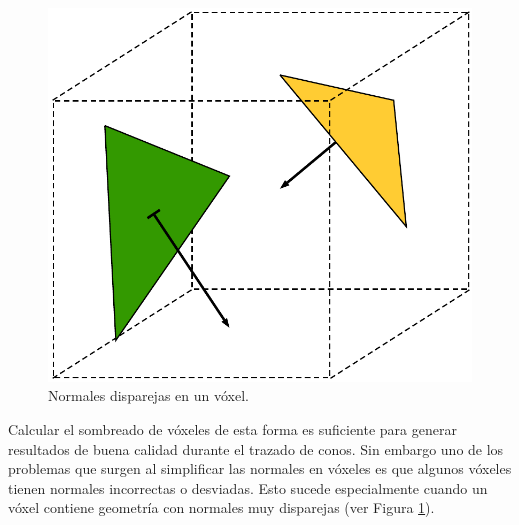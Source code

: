 \begin{figure}
	\centering
	\captionsetup{justification=centering}
	\includegraphics[width=\linewidth]{media/gimped_normals.pdf}
	\caption{Normales disparejas en un vóxel.}
	\label{fig:error_normals}
\end{figure}
\noindent Calcular el sombreado de vóxeles de esta forma es suficiente para generar resultados de buena calidad durante el trazado de conos. Sin embargo uno de los problemas que surgen al simplificar las normales en vóxeles es que algunos vóxeles tienen normales incorrectas o desviadas. Esto sucede especialmente cuando un vóxel contiene geometría con normales muy disparejas (ver Figura \ref{fig:error_normals}).

